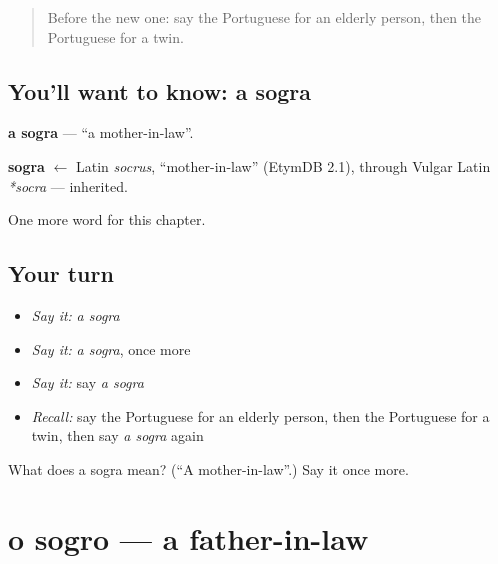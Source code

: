 \label{lesson:PT-C191-sogra}



\begin{quote}
Before the new one: say the Portuguese for an elderly person, then the Portuguese for a twin.
\end{quote}

\subsection*{You'll want to know: a sogra}
\textbf{a sogra} — \textquotedblleft{}a mother-in-law\textquotedblright{}.

\begin{cousinweb}
\textbf{sogra} $\leftarrow$ Latin \emph{socrus}, \textquotedblleft{}mother-in-law\textquotedblright{} (EtymDB 2.1), through Vulgar Latin \emph{*socra} — inherited.
\end{cousinweb}

\begin{grammarlens}[title={What you've built}]
One more word for this chapter.
\end{grammarlens}

\subsection*{Your turn}
\begin{itemize}
\raggedright
  \item \emph{Say it:} \emph{a sogra}
  \item \emph{Say it:} \emph{a sogra}, once more
  \item \emph{Say it:} say \emph{a sogra}
  \item \emph{Recall:} say the Portuguese for an elderly person, then the Portuguese for a twin, then say \emph{a sogra} again
\end{itemize}

\begin{tcolorbox}[breakable,colback=teal!4,colframe=teal!35!black,title={Before you move on}]
What does a sogra mean? (\textquotedblleft{}A mother-in-law\textquotedblright{}.) Say it once more.
\end{tcolorbox}
\section[o sogro]{o sogro — a father-in-law}

\label{lesson:PT-C191-sogro}



